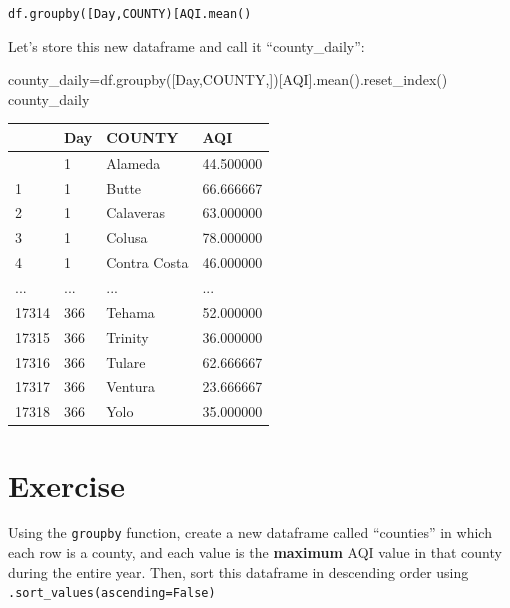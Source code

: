 \documentclass[
  letterpaper,
  DIV=11,
  numbers=noendperiod]{scrreprt}
\newenvironment{Shaded}{\begin{snugshade}}{\end{snugshade}}
\newcommand{\NormalTok}[1]{\textcolor[rgb]{0.00,0.23,0.31}{#1}}
\newcommand{\OperatorTok}[1]{\textcolor[rgb]{0.37,0.37,0.37}{#1}}
\newcommand{\StringTok}[1]{\textcolor[rgb]{0.13,0.47,0.30}{#1}}
\begin{document}
\texttt{df.groupby({[}\textquotesingle{}Day\textquotesingle{},\textquotesingle{}COUNTY\textquotesingle{}{]}){[}\textquotesingle{}AQI\textquotesingle{}{]}.mean()}

Let's store this new dataframe and call it ``county\_daily'':

\begin{Shaded}
\begin{Highlighting}[]
\NormalTok{county\_daily}\OperatorTok{=}\NormalTok{df.groupby([}\StringTok{\textquotesingle{}Day\textquotesingle{}}\NormalTok{,}\StringTok{\textquotesingle{}COUNTY\textquotesingle{}}\NormalTok{,])[}\StringTok{\textquotesingle{}AQI\textquotesingle{}}\NormalTok{].mean().reset\_index()}
\NormalTok{county\_daily}
\end{Highlighting}
\end{Shaded}

\begin{longtable}[]{@{}llll@{}}
\toprule\noalign{}
& Day & COUNTY & AQI \\
\midrule\noalign{}
\endhead
\bottomrule\noalign{}
\endlastfoot
0 & 1 & Alameda & 44.500000 \\
1 & 1 & Butte & 66.666667 \\
2 & 1 & Calaveras & 63.000000 \\
3 & 1 & Colusa & 78.000000 \\
4 & 1 & Contra Costa & 46.000000 \\
... & ... & ... & ... \\
17314 & 366 & Tehama & 52.000000 \\
17315 & 366 & Trinity & 36.000000 \\
17316 & 366 & Tulare & 62.666667 \\
17317 & 366 & Ventura & 23.666667 \\
17318 & 366 & Yolo & 35.000000 \\
\end{longtable}

\hypertarget{exercise-5}{%
\section{Exercise}\label{exercise-5}}

Using the \texttt{groupby} function, create a new dataframe called
``counties'' in which each row is a county, and each value is the
\textbf{maximum} AQI value in that county during the entire year. Then,
sort this dataframe in descending order using
\texttt{.sort\_values(ascending=False)}
\end{document}
